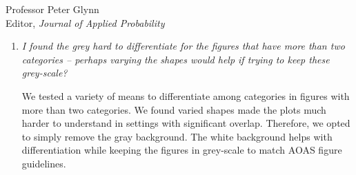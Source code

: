 \documentclass[11pt]{letter} %
\begin{document}
\begin{letter}{Professor
	Peter Glynn\\
	Editor, {\em Journal of Applied Probability}}
\begin{enumerate}
\item {\it I found the grey hard to differentiate for the figures that have more than two categories – perhaps varying the shapes would help if trying to keep these grey-scale?}

\vspace{5mm}
We tested a variety of means to differentiate among categories in figures with more than two categories.  We found varied shapes made the plots much harder to understand in settings with significant overlap.  Therefore, we opted to simply remove the gray background.  The white background helps with differentiation while keeping the figures in grey-scale to match AOAS figure guidelines.
\vspace{5mm}

\end{enumerate}

\end{letter}
\end{document}
